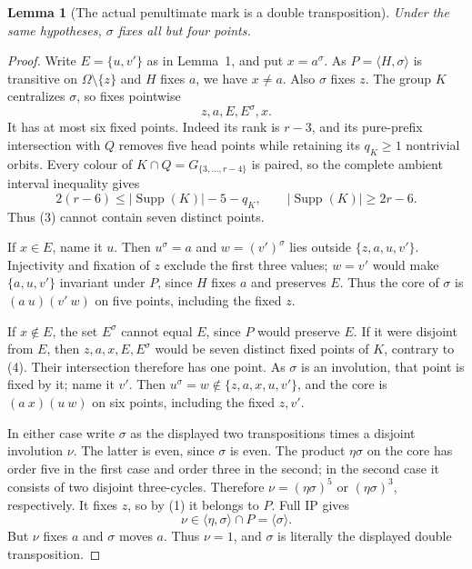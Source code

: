 \documentclass[11pt,a4paper]{article}
\newtheorem{lemma}{Lemma}
\newcommand{\gen}[1]{\langle#1\rangle}
\begin{document}
\begin{lemma}[The actual penultimate mark is a double transposition]
Under the same hypotheses, $\sigma$ fixes all but four points.
\end{lemma}
\begin{proof}
Write $E=\{u,v'\}$ as in Lemma~1, and put $x=a^\sigma$.
As $P=\gen{H,\sigma}$ is transitive on $\Omega\setminus\{z\}$
and $H$ fixes $a$, we have $x\ne a$. Also $\sigma$ fixes $z$.
The group $K$ centralizes $\sigma$, so fixes pointwise
\[
                          z,a,E,E^\sigma,x.            \tag{3}
\]
It has at most six fixed points. Indeed its rank is $r-3$,
and its pure-prefix intersection with $Q$ removes five head
points while retaining its $q_K\ge1$ nontrivial orbits.
Every colour of $K\cap Q=G_{\{3,\ldots,r-4\}}$ is paired,
so the complete ambient interval inequality gives
\[
       2(r-6)\le |\operatorname{Supp}(K)|-5-q_K,
       \qquad |\operatorname{Supp}(K)|\ge2r-6.          \tag{4}
\]
Thus (3) cannot contain seven distinct points.

If $x\in E$, name it $u$. Then $u^\sigma=a$ and
$w=(v')^\sigma$ lies outside $\{z,a,u,v'\}$.
Injectivity and fixation of $z$ exclude the first three values;
$w=v'$ would make $\{a,u,v'\}$ invariant under $P$, since
$H$ fixes $a$ and preserves $E$. Thus the core of $\sigma$
is $(a\ u)(v'\ w)$ on five points, including the fixed $z$.

If $x\notin E$, the set $E^\sigma$ cannot equal $E$, since
$P$ would preserve $E$. If it were disjoint from $E$, then
$z,a,x,E,E^\sigma$ would be seven distinct fixed points of $K$,
contrary to (4). Their intersection therefore has one point.
As $\sigma$ is an involution, that point is fixed by it;
name it $v'$. Then $u^\sigma=w\notin\{z,a,x,u,v'\}$,
and the core is $(a\ x)(u\ w)$ on six points, including
the fixed $z,v'$.

In either case write $\sigma$ as the displayed two
transpositions times a disjoint involution $\nu$.
The latter is even, since $\sigma$ is even. The product
$\eta\sigma$ on the core has order five in the first case
and order three in the second; in the second case it consists
of two disjoint three-cycles. Therefore
$\nu=(\eta\sigma)^5$ or $(\eta\sigma)^3$, respectively.
It fixes $z$, so by (1) it belongs to $P$. Full IP gives
\[
                 \nu\in\gen{\eta,\sigma}\cap P=\gen\sigma.
\]
But $\nu$ fixes $a$ and $\sigma$ moves $a$. Thus $\nu=1$,
and $\sigma$ is literally the displayed double transposition.
\end{proof}
\end{document}
